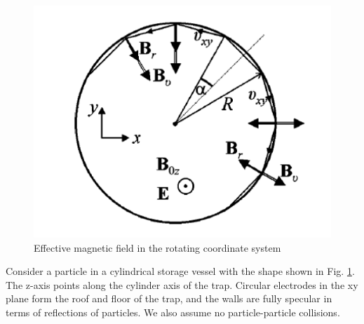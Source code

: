 \begin{figure}[h!]
\label{fig:trap}
  \centering
    \includegraphics[width=.5\textwidth]{trap.png}
    \caption{Effective magnetic field in the rotating coordinate system}
\end{figure}

Consider a particle in a cylindrical storage vessel with the shape
shown in Fig. \ref{fig:trap}.  The z-axis points along the cylinder
axis of the trap.  Circular electrodes in the xy plane form the roof
and floor of the trap, and the walls are fully specular in terms of
reflections of particles.  We also assume no particle-particle
collisions.

